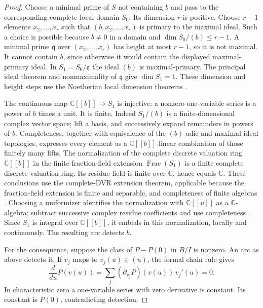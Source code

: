 \begin{proof}
Choose a minimal prime of $S$ not containing $b$ and pass to the
corresponding complete local domain $S_0$. Its dimension $r$ is positive.
Choose $r-1$ elements $x_2,\ldots,x_r$ such that
$(b,x_2,\ldots,x_r)$ is primary to the maximal ideal. Such a choice is
possible because $b\ne0$ in a domain and
$\dim S_0/(b)\leq r-1$. A minimal prime $\mathfrak q$ over
$(x_2,\ldots,x_r)$ has height at most $r-1$, so it is not maximal.
It cannot contain $b$, since otherwise it would contain the displayed
maximal-primary ideal. In $S_1=S_0/\mathfrak q$ the ideal $(b)$ is
maximal-primary. The principal ideal theorem and nonmaximality of
$\mathfrak q$ give $\dim S_1=1$.
These dimension and height steps use the Noetherian local dimension
theorems \cite[Tags 00KQ, 0BBZ, and 00KW]{Stacks}.

The continuous map $\mathbb C[[b]]\longrightarrow S_1$ is injective:
a nonzero one-variable series is a power of $b$ times a unit. It is
finite. Indeed $S_1/(b)$ is a finite-dimensional complex vector space;
lift a basis, and successively expand remainders in powers of $b$.
Completeness, together with equivalence of the $(b)$-adic and maximal
ideal topologies, expresses every element as a $\mathbb C[[b]]$-linear
combination of those finitely many lifts.
The normalization of the complete discrete valuation ring
$\mathbb C[[b]]$ in the finite fraction-field extension
$\operatorname{Frac}(S_1)$ is a finite complete discrete valuation ring.
Its residue field is finite over $\mathbb C$, hence equals $\mathbb C$.
These conclusions use the complete-DVR extension theorem, applicable
because the fraction-field extension is finite and separable, and
completeness of finite algebras
\cite[Tags 09E8 and 0325]{Stacks}.
Choosing a uniformizer identifies the normalization with
$\mathbb C[[u]]$ as a $\mathbb C$-algebra: subtract successive complex
residue coefficients and use completeness
\cite[Tag 0C0S(2)]{Stacks}. Since $S_1$ is integral over
$\mathbb C[[b]]$, it embeds in this normalization, locally and
continuously. The resulting arc detects $b$.

For the consequence, suppose the class of $P-P(0)$ in $B/I$ is nonzero.
An arc as above detects it. If $v_j$ maps to $v_j(u)\in(u)$, the formal
chain rule gives
\[
 \frac{d}{du}P(v(u))
 =\sum_j(\partial_{v_j}P)(v(u))\,v_j'(u)=0.
\]
In characteristic zero a one-variable series with zero derivative is
constant. Its constant is $P(0)$, contradicting detection.
\end{proof}

